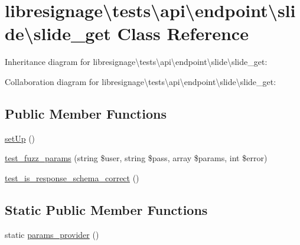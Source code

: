 \hypertarget{classlibresignage_1_1tests_1_1api_1_1endpoint_1_1slide_1_1slide__get}{}\section{libresignage\textbackslash{}tests\textbackslash{}api\textbackslash{}endpoint\textbackslash{}slide\textbackslash{}slide\+\_\+get Class Reference}
\label{classlibresignage_1_1tests_1_1api_1_1endpoint_1_1slide_1_1slide__get}


Inheritance diagram for libresignage\textbackslash{}tests\textbackslash{}api\textbackslash{}endpoint\textbackslash{}slide\textbackslash{}slide\+\_\+get\+:


Collaboration diagram for libresignage\textbackslash{}tests\textbackslash{}api\textbackslash{}endpoint\textbackslash{}slide\textbackslash{}slide\+\_\+get\+:
\subsection*{Public Member Functions}
\begin{DoxyCompactItemize}
\item 
\hyperlink{classlibresignage_1_1tests_1_1api_1_1endpoint_1_1slide_1_1slide__get_ae98db4bcecee218c7430f6d6545401e2}{set\+Up} ()
\item 
\hyperlink{classlibresignage_1_1tests_1_1api_1_1endpoint_1_1slide_1_1slide__get_af2c3197e6073f07b7be00651fe503e75}{test\+\_\+fuzz\+\_\+params} (string \$user, string \$pass, array \$params, int \$error)
\item 
\hyperlink{classlibresignage_1_1tests_1_1api_1_1endpoint_1_1slide_1_1slide__get_a7ec96196294d948b57ced7ce5337ab23}{test\+\_\+is\+\_\+response\+\_\+schema\+\_\+correct} ()
\end{DoxyCompactItemize}
\subsection*{Static Public Member Functions}
\begin{DoxyCompactItemize}
\item 
static \hyperlink{classlibresignage_1_1tests_1_1api_1_1endpoint_1_1slide_1_1slide__get_a063dcff124d2f0f95f82ec8e1eb44e37}{params\+\_\+provider} ()
\end{DoxyCompactItemize}
